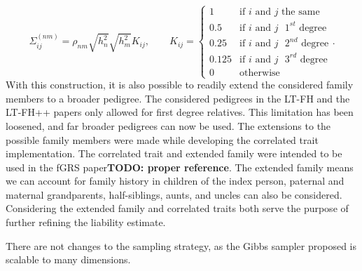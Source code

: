 \begin{equation*}
	\Sigma^{(nm)}_{ij} = \rho_{nm} \sqrt{h^2_{n}}\sqrt{h^2_{m}}K_{ij}, \qquad K_{ij} = 
	\begin{cases} 
		1 		& \text{if } i \text{ and } j \text{ the same} \\
		0.5 	& \text{if } i \text{ and } j \text{ $1^{st}$ degree} \\
		0.25 	& \text{if } i \text{ and } j \text{ $2^{nd}$ degree} \\ 
		0.125 	& \text{if } i \text{ and } j \text{ $3^{rd}$ degree}  \\
		0 		& \text{otherwise}
	\end{cases}.
\end{equation*}
With this construction, it is also possible to readily extend the considered family members to a broader pedigree. The considered pedigrees in the LT-FH and the LT-FH++ papers only allowed for first degree relatives. This limitation has been loosened, and far broader pedigrees can now be used. The extensions to the possible family members were made while developing the correlated trait implementation. The correlated trait and extended family were intended to be used in the fGRS paper\textbf{TODO: proper reference}. The extended family means we can account for family history in children of the index person, paternal and maternal grandparents, half-siblings, aunts, and uncles can also be considered. Considering the extended family and correlated traits both serve the purpose of further refining the liability estimate.

There are not changes to the sampling strategy, as the Gibbs sampler proposed is scalable to many dimensions.
